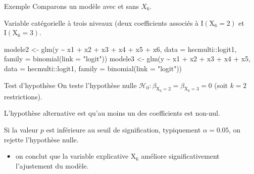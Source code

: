 \documentclass[
  ignorenonframetext,
]{beamer}
\newenvironment{Shaded}{\begin{snugshade}}{\end{snugshade}}
\newcommand{\AttributeTok}[1]{\textcolor[rgb]{0.40,0.45,0.13}{#1}}
\newcommand{\FunctionTok}[1]{\textcolor[rgb]{0.28,0.35,0.67}{#1}}
\newcommand{\NormalTok}[1]{\textcolor[rgb]{0.00,0.23,0.31}{#1}}
\newcommand{\OtherTok}[1]{\textcolor[rgb]{0.00,0.23,0.31}{#1}}
\newcommand{\SpecialCharTok}[1]{\textcolor[rgb]{0.37,0.37,0.37}{#1}}
\newcommand{\StringTok}[1]{\textcolor[rgb]{0.13,0.47,0.30}{#1}}
\providecommand{\tightlist}{%
  \setlength{\itemsep}{0pt}\setlength{\parskip}{0pt}}\usepackage{longtable,booktabs,array}
\begin{document}
\begin{frame}[fragile]{Exemple}
\protect\hypertarget{exemple}{}
Comparons un modèle avec et sans \(X_6\).

Variable catégorielle à trois niveaux (deux coefficients associés à
\(\mathrm{I}(\mathrm{X}_{6}=2)\) et \(\mathrm{I}(\mathrm{X}_{6}=3)\).

\begin{Shaded}
\begin{Highlighting}[numbers=left,,]
\NormalTok{modele2 }\OtherTok{\textless{}{-}}  \FunctionTok{glm}\NormalTok{(y }\SpecialCharTok{\textasciitilde{}}\NormalTok{ x1 }\SpecialCharTok{+}\NormalTok{ x2 }\SpecialCharTok{+}\NormalTok{ x3 }\SpecialCharTok{+}\NormalTok{ x4 }\SpecialCharTok{+}\NormalTok{ x5 }\SpecialCharTok{+}\NormalTok{ x6,}
                 \AttributeTok{data =}\NormalTok{ hecmulti}\SpecialCharTok{::}\NormalTok{logit1,}
                 \AttributeTok{family =} \FunctionTok{binomial}\NormalTok{(}\AttributeTok{link =} \StringTok{"logit"}\NormalTok{))}
\NormalTok{modele3 }\OtherTok{\textless{}{-}}  \FunctionTok{glm}\NormalTok{(y }\SpecialCharTok{\textasciitilde{}}\NormalTok{ x1 }\SpecialCharTok{+}\NormalTok{ x2 }\SpecialCharTok{+}\NormalTok{ x3 }\SpecialCharTok{+}\NormalTok{ x4 }\SpecialCharTok{+}\NormalTok{ x5,}
                 \AttributeTok{data =}\NormalTok{ hecmulti}\SpecialCharTok{::}\NormalTok{logit1,}
                 \AttributeTok{family =} \FunctionTok{binomial}\NormalTok{(}\AttributeTok{link =} \StringTok{"logit"}\NormalTok{)) }
\end{Highlighting}
\end{Shaded}
\end{frame}

\begin{frame}{Test d'hypothèse}
\protect\hypertarget{test-dhypothuxe8se}{}
On teste l'hypothèse nulle
\(\mathscr{H}_0: \beta_{\mathrm{X}_6=2} = \beta_{\mathrm{X}_6=3} = 0\)
(soit \(k=2\) restrictions).

L'hypothèse alternative est qu'au moins un des coefficients est non-nul.

Si la valeur \(p\) est inférieure au seuil de signification, typiquement
\(\alpha = 0.05\), on rejette l'hypothèse nulle.

\begin{itemize}
\tightlist
\item
  on conclut que la variable explicative \(\mathrm{X}_6\) améliore
  significativement l'ajustement du modèle.
\end{itemize}
\end{frame}
\end{document}
